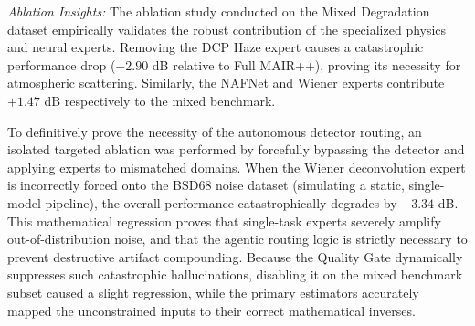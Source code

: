 \documentclass[journal, 10pt]{IEEEtran}
\begin{document}
\begin{table}[h]
\caption{Component Ablation Study (Mixed Degradation Benchmark)}
\label{tab:ablation}
\centering
{}
\end{table}

\noindent\textit{Ablation Insights:} The ablation study conducted on the Mixed Degradation dataset empirically validates the robust contribution of the specialized physics and neural experts. Removing the DCP Haze expert causes a catastrophic performance drop ($-2.90$ dB relative to Full MAIR++), proving its necessity for atmospheric scattering. Similarly, the NAFNet and Wiener experts contribute $+1.47$ dB respectively to the mixed benchmark. 

To definitively prove the necessity of the autonomous detector routing, an isolated targeted ablation was performed by forcefully bypassing the detector and applying experts to mismatched domains. When the Wiener deconvolution expert is incorrectly forced onto the BSD68 noise dataset (simulating a static, single-model pipeline), the overall performance catastrophically degrades by $-3.34$ dB. This mathematical regression proves that single-task experts severely amplify out-of-distribution noise, and that the agentic routing logic is strictly necessary to prevent destructive artifact compounding. Because the Quality Gate dynamically suppresses such catastrophic hallucinations, disabling it on the mixed benchmark subset caused a slight regression, while the primary estimators accurately mapped the unconstrained inputs to their correct mathematical inverses.
\end{document}

